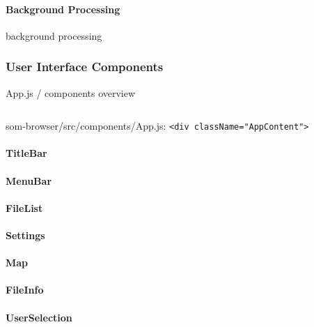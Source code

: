 \paragraph{Background Processing}
\label{para:som-browser_background_processing}
background processing

\subsubsection{User Interface Components}
\label{subsubsec:som-browser_components}
App.js / components overview

\begin{listing}[!htb]
  \begin{mdframed}
    \inputminted[numbers=left, firstline=400, lastline=460,
    fontsize=\scriptsize]{jsx}{../dev/som-browser/src/components/App.js}
  \end{mdframed}
  \caption{som-browser/src/components/App.js:
  \texttt{<div className="AppContent">}}
  \label{lst:som-browser_app_content}
\end{listing}

\paragraph{TitleBar}
\label{para:title_bar}

\paragraph{MenuBar}
\label{para:menu_bar}

\paragraph{FileList}
\label{para:file_list}

\paragraph{Settings}
\label{para:settings}

\paragraph{Map}
\label{para:map}

\paragraph{FileInfo}
\label{para:file_info}

\paragraph{UserSelection}
\label{para:user_selection}

